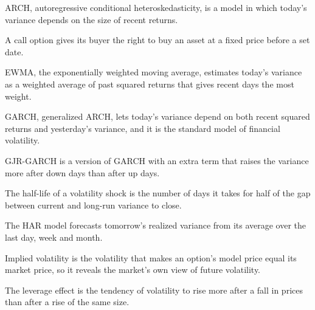 \makeatletter
{}
\makeatother

\begin{keyterms}
\footnotesize
\begin{description}[leftmargin=0pt, itemsep=0pt, parsep=0pt, topsep=0pt, font=\normalfont\bfseries\color{FEMaroon}]
  \item[ARCH.] ARCH, autoregressive conditional heteroskedasticity, is a model in which today's variance depends on the size of recent returns.
  \item[Call option.] A call option gives its buyer the right to buy an asset at a fixed price before a set date.
  \item[EWMA.] EWMA, the exponentially weighted moving average, estimates today's variance as a weighted average of past squared returns that gives recent days the most weight.
  \item[GARCH.] GARCH, generalized ARCH, lets today's variance depend on both recent squared returns and yesterday's variance, and it is the standard model of financial volatility.
  \item[GJR-GARCH.] GJR-GARCH is a version of GARCH with an extra term that raises the variance more after down days than after up days.
  \item[Half-life.] The half-life of a volatility shock is the number of days it takes for half of the gap between current and long-run variance to close.
  \item[HAR model.] The HAR model forecasts tomorrow's realized variance from its average over the last day, week and month.
  \item[Implied volatility.] Implied volatility is the volatility that makes an option's model price equal its market price, so it reveals the market's own view of future volatility.
  \item[Leverage effect.] The leverage effect is the tendency of volatility to rise more after a fall in prices than after a rise of the same size.

\end{description}
\end{keyterms}
